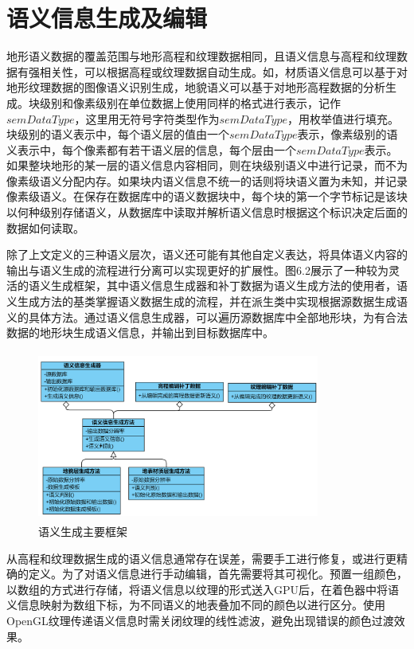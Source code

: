 \section{语义信息生成及编辑}
地形语义数据的覆盖范围与地形高程和纹理数据相同，且语义信息与高程和纹理数据有强相关性，可以根据高程或纹理数据自动生成。如，材质语义信息可以基于对地形纹理数据的图像语义识别生成，地貌语义可以基于对地形高程数据的分析生成。块级别和像素级别在单位数据上使用同样的格式进行表示，记作$semDataType$，这里用无符号字符类型作为$semDataType$，用枚举值进行填充。块级别的语义表示中，每个语义层的值由一个$semDataType$表示，像素级别的语义表示中，每个像素都有若干语义层的信息，每个层由一个$semDataType$表示。如果整块地形的某一层的语义信息内容相同，则在块级别语义中进行记录，而不为像素级语义分配内存。如果块内语义信息不统一的话则将块语义置为未知，并记录像素级语义。在保存在数据库中的语义数据块中，每个块的第一个字节标记是该块以何种级别存储语义，从数据库中读取并解析语义信息时根据这个标识决定后面的数据如何读取。\par
除了上文定义的三种语义层次，语义还可能有其他自定义表达，将具体语义内容的输出与语义生成的流程进行分离可以实现更好的扩展性。图6.2展示了一种较为灵活的语义生成框架，其中语义信息生成器和补丁数据为语义生成方法的使用者，语义生成方法的基类掌握语义数据生成的流程，并在派生类中实现根据源数据生成语义的具体方法。通过语义信息生成器，可以遍历源数据库中全部地形块，为有合法数据的地形块生成语义信息，并输出到目标数据库中。
\begin{figure}[H]
    \centering
   \includegraphics[height=5.6cm,width=9.3cm]{figures/semanticGen.png}
    \caption{语义生成主要框架}
\end{figure}
从高程和纹理数据生成的语义信息通常存在误差，需要手工进行修复，或进行更精确的定义。为了对语义信息进行手动编辑，首先需要将其可视化。预置一组颜色，以数组的方式进行存储，将语义信息以纹理的形式送入GPU后，在着色器中将语义信息映射为数组下标，为不同语义的地表叠加不同的颜色以进行区分。使用OpenGL纹理传递语义信息时需关闭纹理的线性滤波，避免出现错误的颜色过渡效果。\par
